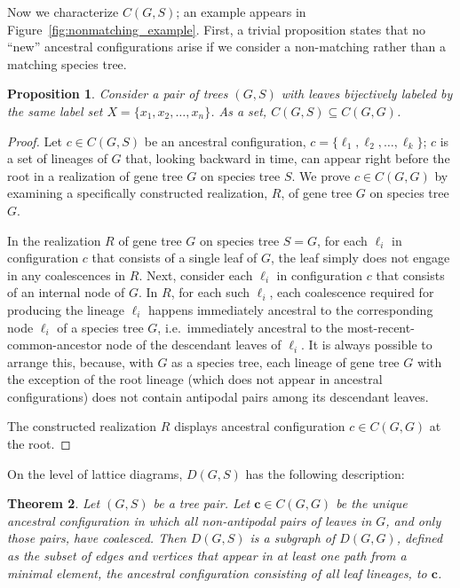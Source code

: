 \documentclass[10pt]{article}
\newtheorem{theorem}{Theorem}
\newtheorem{proposition}[theorem]{Proposition}
\begin{document}
Now we characterize $C(G,S)$; an example appears in Figure~\ref{fig:nonmatching_example}. First, a trivial proposition states that no ``new'' ancestral configurations arise if we consider a non-matching rather than a matching species tree.
\begin{proposition}\label{prop:nonmatching_are_subsets}
	Consider a pair of trees $(G,S)$ with leaves bijectively labeled by the same label set $X = \{x_1,x_2,\ldots, x_n\}$. As a set, $C(G,S) \subseteq C(G,G)$. 
\end{proposition}

\begin{proof}
    Let $c \in C(G,S)$ be an ancestral configuration, $c = \{\ell_1,\ell_2,\ldots, \ell_k\}$; $c$ is a set of lineages of $G$ that, looking backward in time, can appear right before the root in a realization of gene tree $G$ on species tree $S$. We prove $c \in C(G,G)$ by examining a specifically constructed realization, $R$, of gene tree $G$ on species tree $G$. 

    In the realization $R$ of gene tree $G$ on species tree $S=G$, for each $\ell_i$ in configuration $c$ that consists of a single leaf of $G$, the leaf simply does not engage in any coalescences in $R$. Next, consider each $\ell_i$ in configuration $c$ that consists of an internal node of $G$. In $R$, for each such $\ell_i$, each coalescence required for producing the lineage $\ell_i$ happens immediately ancestral to the corresponding node $\ell_i$ of a species tree $G$, i.e.~immediately ancestral to the most-recent-common-ancestor node of the descendant leaves of $\ell_i$. It is always possible to arrange this, because, with $G$ as a species tree, each lineage of gene tree $G$ with the exception of the root lineage (which does not appear in ancestral configurations) does not contain antipodal pairs among its descendant leaves.

    The constructed realization $R$ displays ancestral configuration $c \in C(G,G)$ at the root. 
\end{proof}

On the level of lattice diagrams, $D(G,S)$ has the following description:
\begin{theorem}\label{thm:nonmatching}
	Let $(G,S)$ be a tree pair. Let $\mathbf c \in C(G,G)$ be the unique ancestral configuration in which all non-antipodal pairs of leaves in $G$, and only those pairs, have coalesced. Then $D(G,S)$ is a subgraph of $D(G,G)$, defined as the subset of edges and vertices that appear in at least one path from a minimal element, the ancestral configuration consisting of all leaf lineages, to $\mathbf c$.
\end{theorem}
\end{document}
